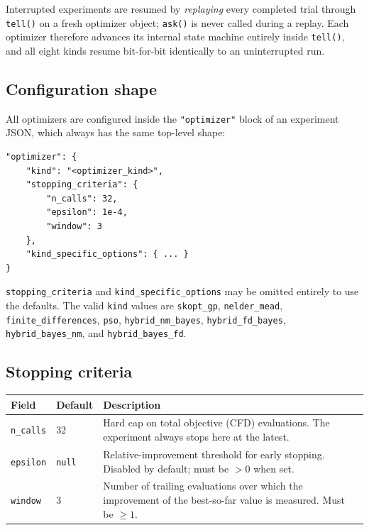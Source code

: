 Interrupted experiments are resumed by
\emph{replaying} every completed trial through \texttt{tell()} on a fresh
optimizer object; \texttt{ask()} is never called during a replay.  Each
optimizer therefore advances its internal state machine entirely inside
\texttt{tell()}, and all eight kinds resume bit-for-bit identically to an
uninterrupted run.

\subsection{Configuration shape}
\label{sec:config-shape}

All optimizers are configured inside the \texttt{"optimizer"} block of an
experiment JSON, which always has the same top-level shape:

\begin{lstlisting}
"optimizer": {
    "kind": "<optimizer_kind>",
    "stopping_criteria": {
        "n_calls": 32,
        "epsilon": 1e-4,
        "window": 3
    },
    "kind_specific_options": { ... }
}
\end{lstlisting}

\texttt{stopping\_criteria} and \texttt{kind\_specific\_options} may be
omitted entirely to use the defaults.  The valid \texttt{kind} values are
\texttt{skopt\_gp}, \texttt{nelder\_mead}, \texttt{finite\_differences},
\texttt{pso}, \texttt{hybrid\_nm\_bayes}, \texttt{hybrid\_fd\_bayes},
\texttt{hybrid\_bayes\_nm}, and \texttt{hybrid\_bayes\_fd}.

\subsection{Stopping criteria}
\label{sec:stopping}

\begin{center}
\begin{tabular}{@{}llp{9cm}@{}}
\toprule
Field & Default & Description \\
\midrule
\texttt{n\_calls} & 32 & Hard cap on total objective (CFD) evaluations. The
experiment always stops here at the latest. \\
\texttt{epsilon} & \texttt{null} & Relative-improvement threshold for early
stopping. Disabled by default; must be $>0$ when set. \\
\texttt{window} & 3 & Number of trailing evaluations over which the
improvement of the best-so-far value is measured. Must be $\geq 1$. \\
\bottomrule
\end{tabular}
\end{center}

